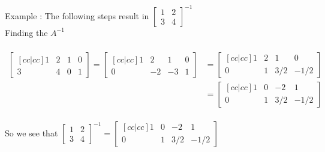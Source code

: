 \documentclass[12pt, right open]{memoir}
\begin{document}
Example :  The following steps result in 
$
\begin{bmatrix}
1 & 2 \\
3 & 4 
\end{bmatrix} ^ {-1}
$ \\

Finding the $A^{-1}$ \\ \\
\begin{align*}   
\begin{bmatrix} [cc|cc]
1 & 2 & 1 & 0 \\
3 & 4 & 0 & 1 
\end{bmatrix} 
=
\begin{bmatrix} [cc|cc]
1 & 2 & 1 & 0 \\
0 & -2 & -3 & 1 
\end{bmatrix}  
&=
\begin{bmatrix} [cc|cc]
1 & 2 & 1 & 0 \\
0 & 1 & 3/2 & -1/2 
\end{bmatrix} \\
&=
\begin{bmatrix} [cc|cc]
1 & 0 & -2 & 1 \\
0 & 1 & 3/2 & -1/2 
\end{bmatrix} \\
\end{align*}  

So we see that
$
\begin{bmatrix}
1 & 2 \\
3 & 4 
\end{bmatrix} ^ {-1} 
=
\begin{bmatrix} [cc|cc]
1 & 0 & -2 & 1 \\
0 & 1 & 3/2 & -1/2 
\end{bmatrix}
$ 
\\
\end{document}
